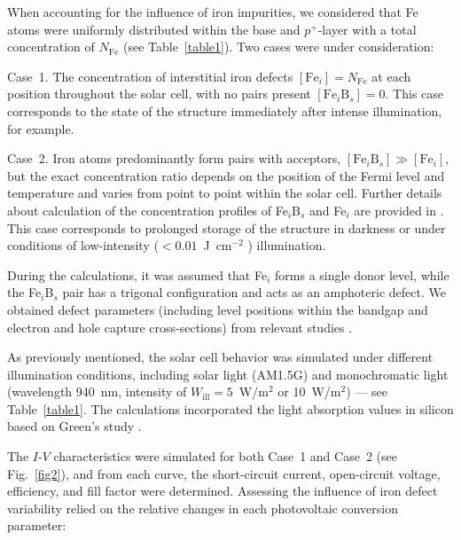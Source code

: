 \documentclass[a4paper,fleqn]{cas-sc}
\begin{document}
When accounting for the influence of iron impurities,
we considered that Fe atoms were uniformly distributed within the base and $p^+$-layer
with a total concentration of $N_\mathrm{Fe}$ (see Table~\ref{table1}).
Two cases were under consideration:

Case~1.
The concentration of interstitial iron defects $\left[\mathrm{Fe}_i\right]=N_\mathrm{Fe}$  at each position throughout the solar cell,
with no pairs present $\left[\mathrm{Fe}_i\mathrm{B}_s\right]=0$.
This case corresponds to the state of the structure immediately after intense illumination, for example.

Case~2.
Iron atoms predominantly form pairs with acceptors, $\left[\mathrm{Fe}_i\mathrm{B}_s\right] \gg \left[\mathrm{Fe}_i\right]$,
but the exact concentration ratio depends on the position of the Fermi level and temperature \cite{FeB:kinetic,MurphyJAP2011}
and varies from point to point within the solar cell.
Further details about calculation of the concentration profiles of Fe$_i$B$_s$ and Fe$_i$ are provided in \cite{Olikh2022PPV,Olikh2019SM}.
This case corresponds to prolonged storage of the structure in darkness or under conditions of low-intensity ($< 0.01$~J~cm$^{-2}$ \cite{Macdonald2004}) illumination.


During the calculations, it was assumed that Fe$_i$ forms a single donor level,
while the Fe$_i$B$_s$ pair has a trigonal configuration and acts as an amphoteric defect.
We obtained defect parameters (including level positions within the bandgap and electron and hole capture cross-sections) from relevant studies \cite{ROUGIEUX2018,Istratov1999,Paudyal}.

As previously mentioned, the solar cell behavior was simulated under different illumination conditions,
including solar light (AM1.5G) and monochromatic light (wavelength 940~nm, intensity of $W_\mathrm{ill} = 5$~W/m$^{2}$ or 10~W/m$^{2}$) --- see Table~\ref{table1}.
The calculations incorporated the light absorption values in silicon based on Green's study \cite{Green2022}.


The $I$-$V$ characteristics were simulated for both Case~1 and Case~2 (see Fig.~\ref{fig2}),
and from each curve, the short-circuit current, open-circuit voltage, efficiency, and fill factor were determined.
Assessing the influence of iron defect variability relied on the relative changes in each photovoltaic conversion parameter:
\end{document}
